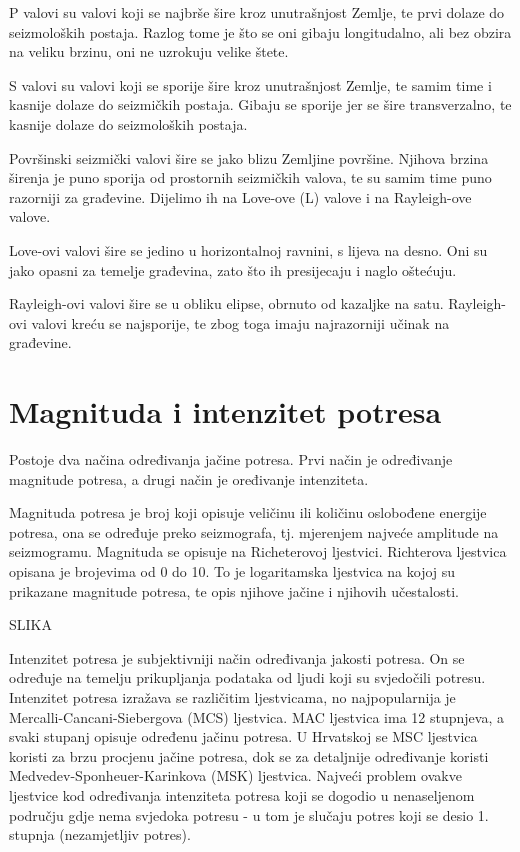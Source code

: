 \documentclass[12pt]{book}
\begin{document}
P valovi su valovi koji se najbrše šire kroz unutrašnjost Zemlje, te prvi dolaze do seizmoloških postaja. Razlog tome je što se oni gibaju longitudalno, ali bez obzira na veliku brzinu, oni ne uzrokuju velike štete. 

S valovi su valovi koji se sporije šire kroz unutrašnjost Zemlje, te samim time i kasnije dolaze do seizmičkih postaja. Gibaju se sporije jer se šire transverzalno, te kasnije dolaze do seizmoloških postaja.

Površinski seizmički valovi šire se jako blizu Zemljine površine. Njihova brzina širenja je puno sporija od prostornih seizmičkih valova, te su samim time puno razorniji za građevine. Dijelimo ih na Love-ove (L) valove i na Rayleigh-ove valove. 

Love-ovi valovi šire se jedino u horizontalnoj ravnini, s lijeva na desno. Oni su jako opasni za temelje građevina, zato što ih presijecaju i naglo oštećuju.

Rayleigh-ovi valovi šire se u obliku elipse, obrnuto od kazaljke na satu. Rayleigh-ovi valovi kreću se najsporije, te zbog toga imaju najrazorniji učinak na građevine.

\section{Magnituda i intenzitet potresa}

Postoje dva načina određivanja jačine potresa. Prvi način je određivanje magnitude potresa, a drugi način je oređivanje intenziteta.

Magnituda potresa je broj koji opisuje veličinu ili količinu oslobođene energije potresa, ona se određuje preko seizmografa, tj. mjerenjem najveće amplitude na seizmogramu. Magnituda se opisuje na Richeterovoj ljestvici. Richterova ljestvica opisana je brojevima od 0 do 10. To je logaritamska ljestvica na kojoj su prikazane magnitude potresa, te opis njihove jačine i njihovih učestalosti.

SLIKA

Intenzitet potresa je subjektivniji način određivanja jakosti potresa. On se određuje na temelju prikupljanja podataka od ljudi koji su svjedočili potresu. Intenzitet potresa izražava se različitim ljestvicama, no najpopularnija je Mercalli-Cancani-Siebergova (MCS) ljestvica. MAC ljestvica ima 12 stupnjeva, a svaki stupanj opisuje određenu jačinu potresa. U Hrvatskoj se MSC ljestvica koristi za brzu procjenu jačine potresa, dok se za detaljnije određivanje koristi Medvedev-Sponheuer-Karinkova (MSK) ljestvica. Najveći problem ovakve ljestvice kod određivanja intenziteta potresa koji se dogodio u nenaseljenom području gdje nema svjedoka potresu - u tom je slučaju potres koji se desio 1. stupnja (nezamjetljiv potres).
\end{document}
